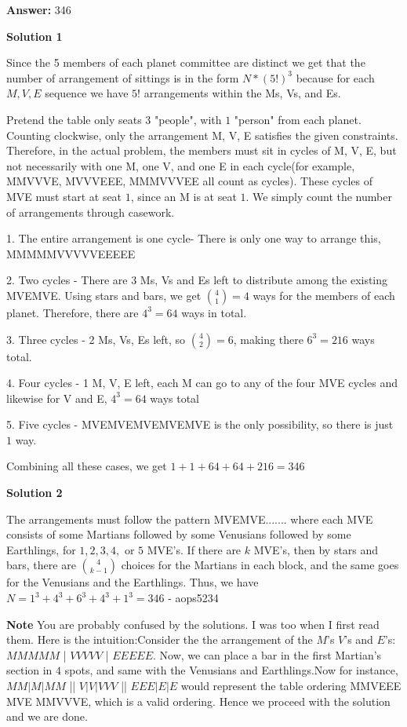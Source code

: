 \begin{enumerate}
 
 \textbf{Answer: }346



\textbf{Solution 1}

Since the 5 members of each planet committee are distinct we get that the number of arrangement of sittings is in the form $N*(5!)^3$ because for each $M, V, E$ sequence we have $5!$ arrangements within the Ms, Vs, and Es.

 Pretend the table only seats $3$ "people", with $1$ "person" from each planet. Counting clockwise, only the arrangement M, V, E satisfies the given constraints. Therefore, in the actual problem, the members must sit in cycles of M, V, E, but not necessarily with one M, one V, and one E in each cycle(for example, MMVVVE, MVVVEEE, MMMVVVEE all count as cycles). These cycles of MVE must start at seat $1$, since an M is at seat $1$. We simply count the number of arrangements through casework.

 1. The entire arrangement is one cycle- There is only one way to arrange this, MMMMMVVVVVEEEEE

 2. Two cycles - There are 3 Ms, Vs and Es left to distribute among the existing MVEMVE. Using stars and bars, we get $\binom{4}{1}=4$ ways for the members of each planet. Therefore, there are $4^3=64$ ways in total.

 3. Three cycles - 2 Ms, Vs, Es left, so $\binom{4}{2}=6$, making there $6^3=216$ ways total.

 4. Four cycles - 1 M, V, E left, each M can go to any of the four MVE cycles and likewise for V and E, $4^3=64$ ways total

 5. Five cycles - MVEMVEMVEMVEMVE is the only possibility, so there is just $1$ way.

 Combining all these cases, we get $1+1+64+64+216= \boxed{346}$




\textbf{Solution 2}

The arrangements must follow the pattern MVEMVE....... where each MVE consists of some Martians followed by some Venusians followed by some Earthlings, for $1, 2, 3, 4,$ or $5$ MVE's. If there are $k$ MVE's, then by stars and bars, there are ${4 \choose k-1}$ choices for the Martians in each block, and the same goes for the Venusians and the Earthlings. Thus, we have $N = 1^3+4^3+6^3+4^3+1^3 = \boxed{346}$ - aops5234

 \textbf{Note} You are probably confused by the solutions. I was too when I first read them. Here is the intuition:Consider the the arrangement of the $M$'s $V$'s and $E$'s: $MMMMM$ | $VVVVV$ | $EEEEE$. Now, we can place a bar in the first Martian's section in $4$ spots, and same with the Venusians and Earthlings.Now for instance, $MM|M|MM$    ||    $V|V|VVV$    ||    $EEE|E|E$ would represent the table ordering MMVEEE MVE MMVVVE, which is a valid ordering. Hence we proceed with the solution and we are done.


\end{enumerate}
